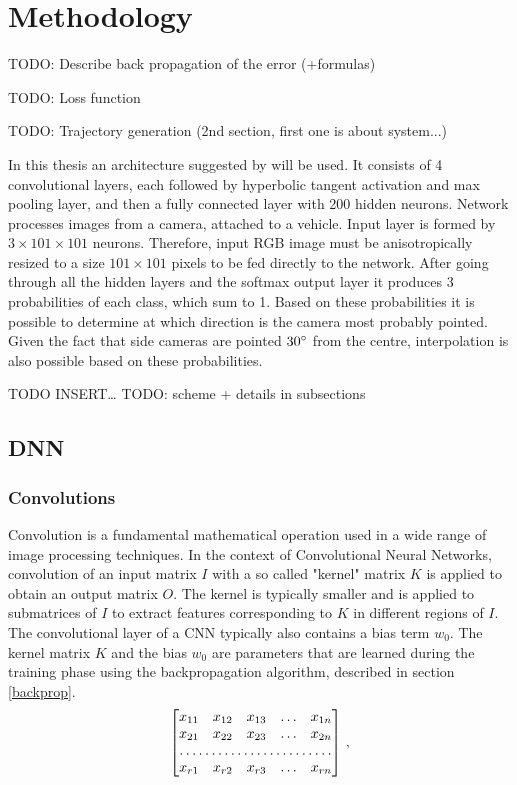 \chapter{Methodology}

TODO: Describe back propagation of the error (+formulas)

TODO: Loss function

TODO: Trajectory generation (2nd section, first one is about system...)

In this thesis an architecture suggested by \citeauthor{giusti2016machine} will be used. It consists of 4 convolutional layers, each followed by hyperbolic tangent activation and max pooling layer, and then a fully connected layer with 200 hidden neurons. Network processes images from a camera, attached to a vehicle. Input layer is formed by $3\times 101\times101$ neurons. Therefore, input RGB image must be anisotropically resized to a size $101\times101$ pixels to be fed directly to the network. After going through all the hidden layers and the softmax output layer it produces 3 probabilities of each class, which sum to 1. Based on these probabilities it is possible to determine at which direction is the camera most probably pointed. Given the fact that side cameras are pointed $30 \degree$ from the centre, interpolation is also possible based on these probabilities.  

TODO INSERT… TODO: scheme + details in subsections



\section{DNN}
\subsection{Convolutions}

Convolution is a fundamental mathematical operation used in a wide range of image processing techniques. In the context of Convolutional Neural Networks, convolution of an input matrix $I$ with a so called "kernel" matrix $K$ is applied to obtain an output matrix $O$. The kernel is typically smaller and is applied to submatrices of $I$ to extract features corresponding to $K$ in different regions of $I$. The convolutional layer of a CNN typically also contains a bias term $w_0$. The kernel matrix $K$ and the bias $w_0$ are parameters that are learned during the training phase using the backpropagation algorithm, described in section \ref{backprop}. 
\begin{equation}
	\begin{bmatrix}
    x_{11}       & x_{12} & x_{13} & \dots & x_{1n} \\
    x_{21}       & x_{22} & x_{23} & \dots & x_{2n} \\
    \hdotsfor{5} \\
    x_{r1}       & x_{r2} & x_{r3} & \dots & x_{rn}
\end{bmatrix}\,,
\label{Input data}
\end{equation}

